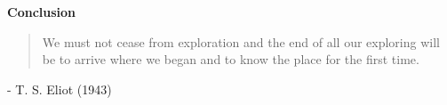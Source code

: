 \begin{frame}\begin{center}
\LARGE\textbf{Conclusion}
\end{center}\end{frame}
\begin{frame}
\begin{quote}\Large
We must not cease from exploration and the end of all our exploring will be to arrive where we began and to know the place for the first time.
\end{quote}\vspace{-0.5pt} \hspace{6cm} - T. S. Eliot (1943)
\nocite{Eliot.1943}
\end{frame}
